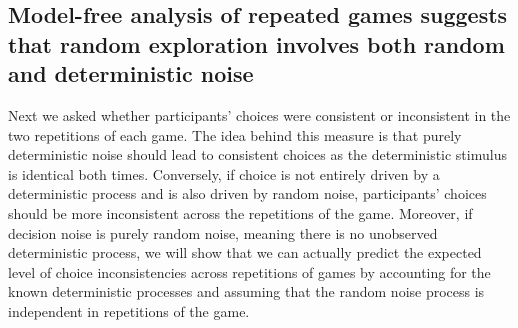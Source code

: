 \documentclass[12pt]{article}
\begin{document}
{	



\subsection*{Model-free analysis of repeated games suggests that random exploration involves both random and deterministic noise}

Next we asked whether participants' choices were consistent or inconsistent in the two repetitions of each game. The idea behind this measure is that purely deterministic noise should lead to consistent choices as the deterministic stimulus is identical both times. Conversely, if choice is not entirely driven by a deterministic process and is also driven by random noise, participants' choices should be more inconsistent across the repetitions of the game. Moreover, if decision noise is purely random noise, meaning there is no unobserved deterministic process, we will show that we can actually predict the expected level of choice inconsistencies across repetitions of games by accounting for the known deterministic processes and assuming that the random noise process is independent in repetitions of the game.

}
\end{document}
